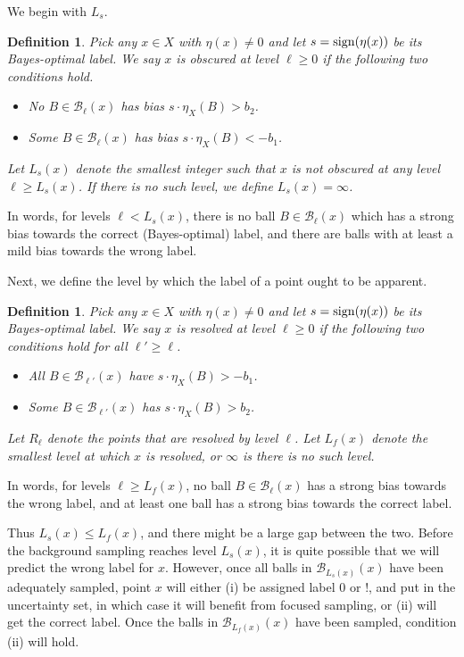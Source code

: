 \documentclass{article}
\def\B{{\mathcal B}}
\def\sign{{\rm sign}}
\newtheorem{defn}[thm]{Definition}
\begin{document}
We begin with $L_s$.

\begin{defn}
Pick any $x \in X$ with $\eta(x) \neq 0$ and let $s = \sign(\eta(x))$ be its Bayes-optimal label. We say $x$ is \emph{obscured} at level $\ell \geq 0$ if the following two conditions hold.
\begin{itemize}
\item No $B \in \B_\ell(x)$ has bias $s \cdot \eta_X(B) > b_2$.
\item Some $B \in \B_\ell(x)$ has bias $s \cdot \eta_X(B) < -b_1$.
\end{itemize}
Let $L_s(x)$ denote the smallest integer such that $x$ is not obscured at any level $\ell \geq L_s(x)$. If there is no such level, we define $L_s(x) = \infty$.
\label{defn:Ls}
\end{defn}
In words, for levels $\ell < L_s(x)$, there is no ball $B \in \B_\ell(x)$ which has a strong bias towards the correct (Bayes-optimal) label, and there are balls with at least a mild bias towards the wrong label.

Next, we define the level by which the label of a point ought to be apparent.
\begin{defn}
Pick any $x \in X$ with $\eta(x) \neq 0$ and let $s = \sign(\eta(x))$ be its Bayes-optimal label. We say $x$ is \emph{resolved} at level $\ell \geq 0$ if the following two conditions hold for all $\ell' \geq \ell$.
\begin{itemize}
\item All $B \in \B_{\ell'}(x)$ have $s \cdot \eta_X(B) > -b_1$.
\item Some $B \in \B_{\ell'}(x)$ has $s \cdot \eta_X(B) > b_2$.
\end{itemize}
Let $R_\ell$ denote the points that are resolved by level $\ell$. Let $L_f(x)$ denote the smallest level at which $x$ is resolved, or $\infty$ is there is no such level.
\label{defn:Lf}
\end{defn}
In words, for levels $\ell \geq L_f(x)$, no ball $B \in \B_\ell(x)$ has a strong bias towards the wrong label, and at least one ball has a strong bias towards the correct label.


Thus $L_s(x) \leq L_f(x)$, and there might be a large gap between the two. Before the background sampling reaches level $L_s(x)$, it is quite possible that we will predict the wrong label for $x$. However, once all balls in $\B_{L_s(x)}(x)$ have been adequately sampled, point $x$ will either (i) be assigned label $0$ or $!$, and put in the uncertainty set, in which case it will benefit from focused sampling, or (ii) will get the correct label. Once the balls in $\B_{L_f(x)}(x)$ have been sampled, condition (ii) will hold.
\end{document}
